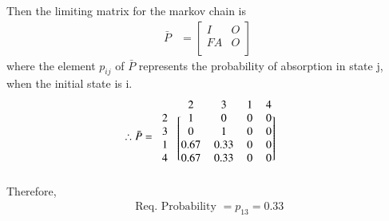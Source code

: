 \documentclass[journal,12pt,twocolumn]{IEEEtran}
\begin{document}
Then the limiting matrix for the markov chain is 
\begin{align}
\label{5}
    \bar P&=\begin{bmatrix}
    I & O\\
    FA & O\\
    \end{bmatrix}
\end{align}
where the element $p_{ij}$ of $\bar P$ represents the probability of absorption in state j, when the initial state is i.
\begin{align}
  \therefore \bar P&=\begin{blockarray}{ccccc}
                  & 2 & 3 & 1 & 4 \\
                  \begin{block}{c[cccc]}
                  2 & 1 & 0 & 0 & 0  \\
                  3 & 0 & 1 & 0 & 0 \\ 
                  1 & 0.67 & 0.33 & 0 & 0 \\
                  4 & 0.67 & 0.33 & 0 & 0 \\
                \end{block}
                \end{blockarray}  
\end{align}
Therefore,
\begin{align}
    \text{ Req. Probability }= p_{13} = 0.33
\end{align}
\end{document}

